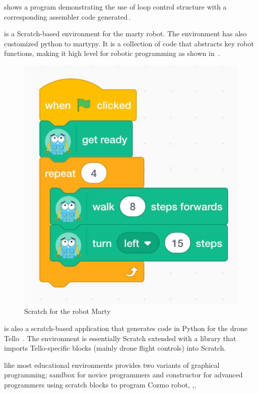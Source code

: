  shows a program demonstrating the use of loop control structure with a corresponding assembler code generated\,\cite{Metabot,Passault2016}.

\parhead{\marty} is a Scratch-based environment for the marty robot. The environment has also customized python to martypy. It is a collection of code that abstracts key robot functions, making it high level for robotic programming as shown in \,\cite{Marty}. 

\begin{figure}[t]
     \centering
    \includegraphics[width=.6\columnwidth]{ScratchMarty.jpg}
      \caption{Scratch for the robot Marty\,\cite{Marty} }
      \label{scratch-marty}
   \end{figure}

\parhead{\tello} is also a scratch-based application that generates code in Python for the drone Tello %
\,\cite{TelloEduApp}. The environment is essentially Scratch extended with a library that imports Tello-specific blocks (mainly drone flight controls) into Scratch.

\parhead{\codelab} like most educational environments provides two variants of graphical programming; sandbox for novice programmers and constructor for advanced programmers using scratch blocks to program Cozmo robot,
,\cite{COZMO}.  %

